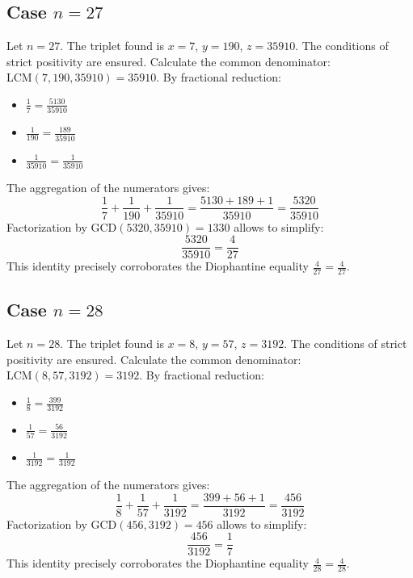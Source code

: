 \documentclass[11pt,a4paper]{article}
\begin{document}
\subsection{Case $n = 27$}
Let $n = 27$. The triplet found is $x = 7$, $y = 190$, $z = 35910$.
The conditions of strict positivity are ensured.
Calculate the common denominator: $\text{LCM}(7, 190, 35910) = 35910$.
By fractional reduction:
\begin{itemize}
    \item $\frac{1}{7} = \frac{5130}{35910}$
    \item $\frac{1}{190} = \frac{189}{35910}$
    \item $\frac{1}{35910} = \frac{1}{35910}$
\end{itemize}
The aggregation of the numerators gives:
$$ \frac{1}{7} + \frac{1}{190} + \frac{1}{35910} = \frac{5130 + 189 + 1}{35910} = \frac{5320}{35910} $$
Factorization by $\text{GCD}(5320, 35910) = 1330$ allows to simplify:
$$ \frac{5320}{35910} = \frac{4}{27} $$
This identity precisely corroborates the Diophantine equality $\frac{4}{27} = \frac{4}{27}$.

\subsection{Case $n = 28$}
Let $n = 28$. The triplet found is $x = 8$, $y = 57$, $z = 3192$.
The conditions of strict positivity are ensured.
Calculate the common denominator: $\text{LCM}(8, 57, 3192) = 3192$.
By fractional reduction:
\begin{itemize}
    \item $\frac{1}{8} = \frac{399}{3192}$
    \item $\frac{1}{57} = \frac{56}{3192}$
    \item $\frac{1}{3192} = \frac{1}{3192}$
\end{itemize}
The aggregation of the numerators gives:
$$ \frac{1}{8} + \frac{1}{57} + \frac{1}{3192} = \frac{399 + 56 + 1}{3192} = \frac{456}{3192} $$
Factorization by $\text{GCD}(456, 3192) = 456$ allows to simplify:
$$ \frac{456}{3192} = \frac{1}{7} $$
This identity precisely corroborates the Diophantine equality $\frac{4}{28} = \frac{4}{28}$.
\end{document}
